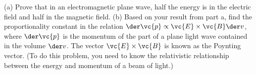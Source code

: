         (a) Prove that in an electromagnetic plane wave, half the energy
        is in the electric field and half in the magnetic field.\hwendpart
        (b) Based on your result from part a, find the proportionality
        constant in the relation $\der\vc{p}\propto\vc{E}\times\vc{B}\der v$,
        where $\der \vc{p}$ is the momentum of the part of a plane light wave contained in the
        volume $\der v$. The vector $\vc{E}\times\vc{B}$ is known as the 
        Poynting vector. (To do this problem, you need to know the relativistic relationship between
        the energy and momentum of a beam of light.)\answercheck
